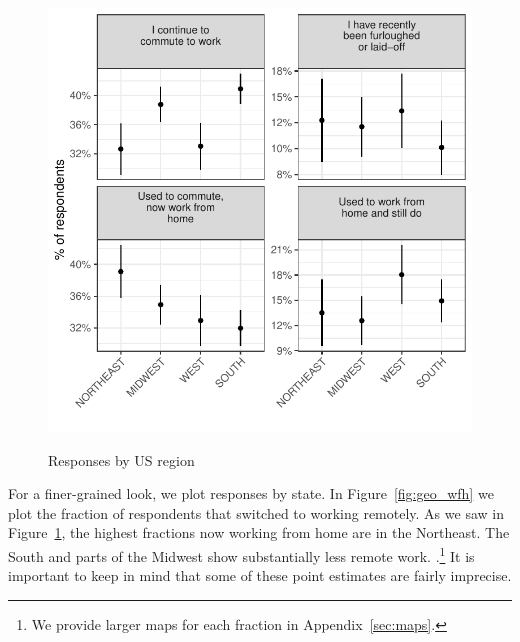 \documentclass[12pt]{article}
\begin{document}
\begin{figure}
  \caption{Responses by US region} \label{fig:region}
\centering
\begin{minipage}{1.0 \linewidth}
  \includegraphics[width = \linewidth]{plots/region.pdf} \\
  \begin{footnotesize}
    \end{footnotesize}
\end{minipage}
\end{figure} 

For a finer-grained look, we plot responses by state.
In Figure~\ref{fig:geo_wfh} we plot the fraction of respondents that switched to working remotely. 
As we saw in Figure~\ref{fig:region}, the highest fractions now working from home are in the Northeast.
The South and parts of the Midwest show substantially less remote work. 
.\footnote{
  We provide larger maps for each fraction in Appendix~\ref{sec:maps}. 
}
It is important to keep in mind that some of these point estimates are fairly imprecise.

\end{document}
